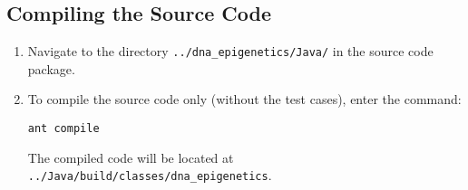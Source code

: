 \subsection{Compiling the Source Code}
\begin{enumerate}
\item Navigate to the directory \texttt{../dna\_epigenetics/Java/} in the source code package.
\item To compile the source code only (without the test cases), enter the command:
\begin{lstlisting}
ant compile
\end{lstlisting}
The compiled code will be located at \texttt{../Java/build/classes/dna\_epigenetics}.
\end{enumerate}

